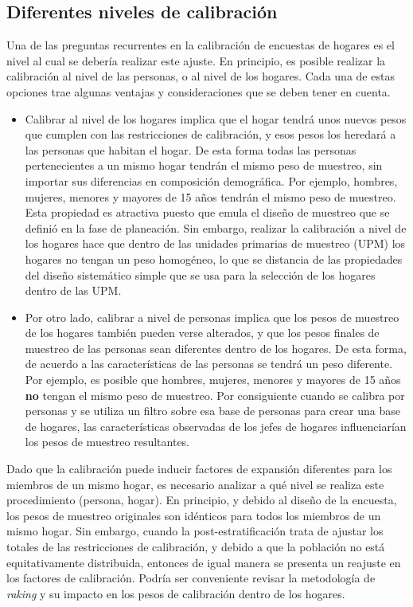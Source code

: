 \documentclass[
  10pt,
  spanish,
]{book}
\begin{document}
\hypertarget{diferentes-niveles-de-calibraciuxf3n}{%
\subsection{Diferentes niveles de calibración}\label{diferentes-niveles-de-calibraciuxf3n}}

Una de las preguntas recurrentes en la calibración de encuestas de hogares es el nivel al cual se debería realizar este ajuste. En principio, es posible realizar la calibración al nivel de las personas, o al nivel de los hogares. Cada una de estas opciones trae algunas ventajas y consideraciones que se deben tener en cuenta.

\begin{itemize}
\item
  Calibrar al nivel de los hogares implica que el hogar tendrá unos nuevos pesos que cumplen con las restricciones de calibración, y esos pesos los heredará a las personas que habitan el hogar. De esta forma todas las personas pertenecientes a un mismo hogar tendrán el mismo peso de muestreo, sin importar sus diferencias en composición demográfica. Por ejemplo, hombres, mujeres, menores y mayores de 15 años tendrán el mismo peso de muestreo. Esta propiedad es atractiva puesto que emula el diseño de muestreo que se definió en la fase de planeación. Sin embargo, realizar la calibración a nivel de los hogares hace que dentro de las unidades primarias de muestreo (UPM) los hogares no tengan un peso homogéneo, lo que se distancia de las propiedades del diseño sistemático simple que se usa para la selección de los hogares dentro de las UPM.
\item
  Por otro lado, calibrar a nivel de personas implica que los pesos de muestreo de los hogares también pueden verse alterados, y que los pesos finales de muestreo de las personas sean diferentes dentro de los hogares. De esta forma, de acuerdo a las características de las personas se tendrá un peso diferente. Por ejemplo, es posible que hombres, mujeres, menores y mayores de 15 años \textbf{no} tengan el mismo peso de muestreo. Por consiguiente cuando se calibra por personas y se utiliza un filtro sobre esa base de personas para crear una base de hogares, las características observadas de los jefes de hogares influenciarían los pesos de muestreo resultantes.
\end{itemize}

Dado que la calibración puede inducir factores de expansión diferentes para los miembros de un mismo hogar, es necesario analizar a qué nivel se realiza este procedimiento (persona, hogar). En principio, y debido al diseño de la encuesta, los pesos de muestreo originales son idénticos para todos los miembros de un mismo hogar. Sin embargo, cuando la post-estratificación trata de ajustar los totales de las restricciones de calibración, y debido a que la población no está equitativamente distribuida, entonces de igual manera se presenta un reajuste en los factores de calibración. Podría ser conveniente revisar la metodología de \emph{raking} y su impacto en los pesos de calibración dentro de los hogares.
\end{document}

